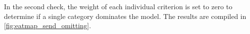 
In the second check, the weight of each individual criterion is set to zero to determine if a single category dominates the model. The results are compiled in \autoref{fig:eatmap_send_omitting}.

\iffalse

